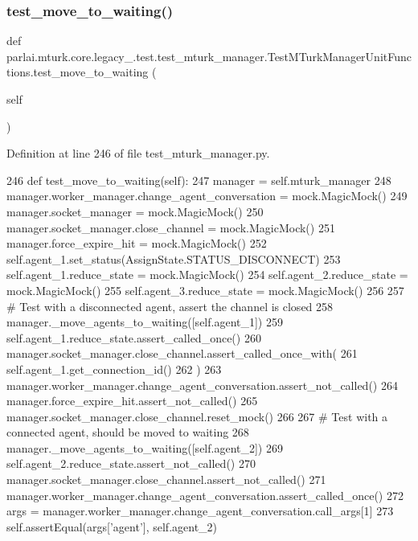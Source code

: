 \subsubsection{\texorpdfstring{test\+\_\+move\+\_\+to\+\_\+waiting()}{test\_move\_to\_waiting()}}
{\footnotesize\ttfamily def parlai.\+mturk.\+core.\+legacy\+\_.\+test.\+test\+\_\+mturk\+\_\+manager.\+Test\+M\+Turk\+Manager\+Unit\+Functions.\+test\+\_\+move\+\_\+to\+\_\+waiting (\begin{DoxyParamCaption}\item[{}]{self }\end{DoxyParamCaption})}



Definition at line 246 of file test\+\_\+mturk\+\_\+manager.\+py.


\begin{DoxyCode}
246     \textcolor{keyword}{def }test\_move\_to\_waiting(self):
247         manager = self.mturk\_manager
248         manager.worker\_manager.change\_agent\_conversation = mock.MagicMock()
249         manager.socket\_manager = mock.MagicMock()
250         manager.socket\_manager.close\_channel = mock.MagicMock()
251         manager.force\_expire\_hit = mock.MagicMock()
252         self.agent\_1.set\_status(AssignState.STATUS\_DISCONNECT)
253         self.agent\_1.reduce\_state = mock.MagicMock()
254         self.agent\_2.reduce\_state = mock.MagicMock()
255         self.agent\_3.reduce\_state = mock.MagicMock()
256 
257         \textcolor{comment}{# Test with a disconnected agent, assert the channel is closed}
258         manager.\_move\_agents\_to\_waiting([self.agent\_1])
259         self.agent\_1.reduce\_state.assert\_called\_once()
260         manager.socket\_manager.close\_channel.assert\_called\_once\_with(
261             self.agent\_1.get\_connection\_id()
262         )
263         manager.worker\_manager.change\_agent\_conversation.assert\_not\_called()
264         manager.force\_expire\_hit.assert\_not\_called()
265         manager.socket\_manager.close\_channel.reset\_mock()
266 
267         \textcolor{comment}{# Test with a connected agent, should be moved to waiting}
268         manager.\_move\_agents\_to\_waiting([self.agent\_2])
269         self.agent\_2.reduce\_state.assert\_not\_called()
270         manager.socket\_manager.close\_channel.assert\_not\_called()
271         manager.worker\_manager.change\_agent\_conversation.assert\_called\_once()
272         args = manager.worker\_manager.change\_agent\_conversation.call\_args[1]
273         self.assertEqual(args[\textcolor{stringliteral}{'agent'}], self.agent\_2)

\end{DoxyCode}

